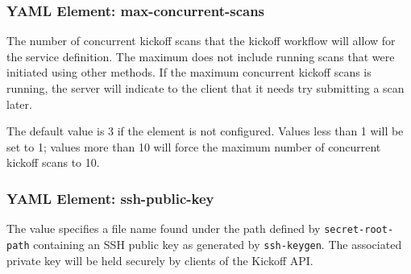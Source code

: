 \subsubsection{YAML Element: max-concurrent-scans}\label{sec:yaml-kickoff-max-concurrent-scans}
The number of concurrent kickoff scans that the kickoff workflow will allow for the service definition.
The maximum does not include running scans that were initiated using other methods. If the
maximum concurrent kickoff scans is running, the server will indicate to the client that it needs
try submitting a scan later.

The default value is 3 if the element is not configured.  Values less than 1 will be
set to 1; values more than 10 will force the maximum number of concurrent kickoff scans
to 10.  


\subsubsection{YAML Element: ssh-public-key}\label{sec:yaml-kickoff-ssh-public-key}
The value specifies a file name found under the path defined by \texttt{secret-root-path}
containing an SSH public key as generated by \texttt{ssh-keygen}.  The associated private key will be
held securely by clients of the Kickoff API.

